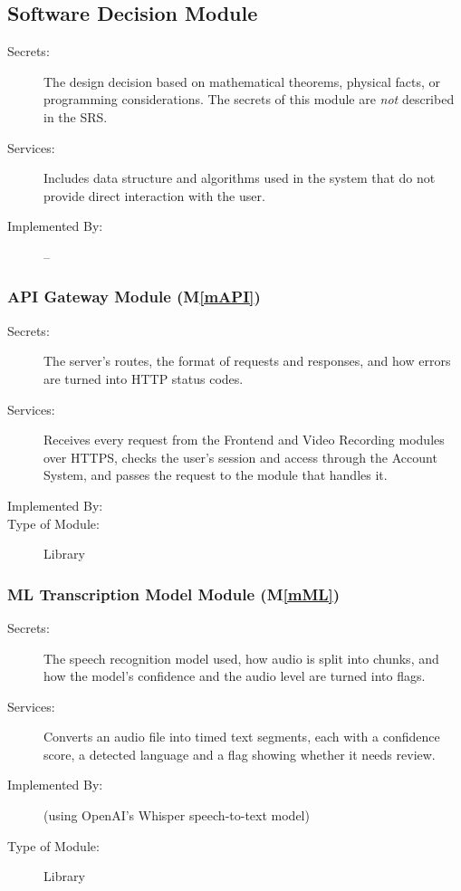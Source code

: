 \documentclass[12pt, titlepage]{article}
\newcommand{\mref}[1]{M\ref{#1}}
\begin{document}
\subsection{Software Decision Module}

\begin{description}
\item[Secrets:] The design decision based on mathematical theorems, physical
  facts, or programming considerations. The secrets of this module are
  \emph{not} described in the SRS.
\item[Services:] Includes data structure and algorithms used in the system that
  do not provide direct interaction with the user. 
\item[Implemented By:] --
\end{description}

\subsubsection{API Gateway Module (\mref{mAPI})}
\begin{description}
\item[Secrets:]The server's routes, the format of requests and responses, and how errors are turned into HTTP status codes.
\item[Services:]Receives every request from the Frontend and Video Recording modules over HTTPS, checks the user's session and access through the Account System, and passes the request to the module that handles it.
\item[Implemented By:] \progname{}
\item[Type of Module:] Library
\end{description}

\subsubsection{ML Transcription Model Module (\mref{mML})}
\begin{description}
\item[Secrets:]The speech recognition model used, how audio is split into chunks, and how the model's confidence and the audio level are turned into flags.
\item[Services:]Converts an audio file into timed text segments, each with a confidence score, a detected language and a flag showing whether it needs review.
\item[Implemented By:] \progname{} (using OpenAI's Whisper speech-to-text model)
\item[Type of Module:] Library
\end{description}
\end{document}

